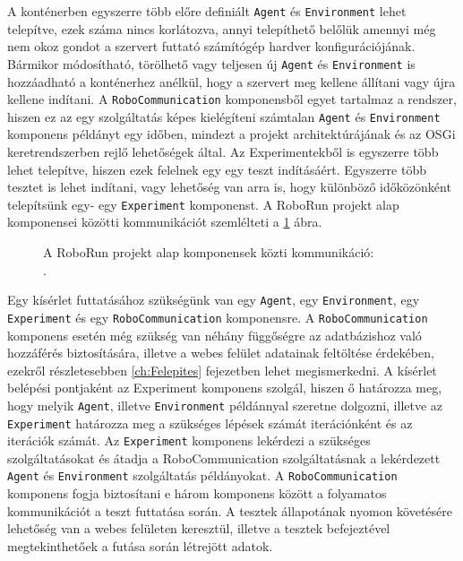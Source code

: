 	 A konténerben egyszerre több előre definiált \texttt{Agent} és \texttt{Environment} lehet telepítve, ezek száma nincs korlátozva, annyi telepíthető belőlük amennyi még nem okoz gondot a szervert futtató számítógép hardver konfigurációjának. Bármikor módosítható, törölhető vagy teljesen új \texttt{Agent} és \texttt{Environment} is hozzáadható a konténerhez anélkül, hogy a szervert meg kellene állítani vagy újra kellene indítani. A \texttt{RoboCommunication} komponensből egyet tartalmaz a rendszer, hiszen ez az egy szolgáltatás képes kielégíteni számtalan \texttt{Agent} és \texttt{Environment} komponens példányt egy időben, mindezt a projekt architektúrájának és az OSGi keretrendszerben rejlő lehetőségek által. Az Experimentekből is egyszerre több lehet telepítve, hiszen ezek felelnek egy egy teszt indításáért. Egyszerre több tesztet is lehet indítani, vagy lehetőség van arra is, hogy különböző időközönként telepítsünk egy- egy \texttt{Experiment} komponenst. A RoboRun projekt alap komponensei közötti kommunikációt szemlélteti a \ref{fig:OsgiAlap} ábra.

\begin{figure}[h!]
  \centering
  \caption[RoboRun alap komponensek]%
  {A RoboRun projekt alap komponensek közti kommunikáció:\\
  {\white .}\hfill\url{}}
  \label{fig:OsgiAlap}
\end{figure}


Egy kísérlet futtatásához szükségünk van egy \texttt{Agent}, egy \texttt{Environment}, egy \texttt{Experiment} és egy \texttt{RoboCommunication} komponensre. A \texttt{RoboCommunication} komponens esetén még szükség van néhány függőségre az adatbázishoz való hozzáférés biztosítására, illetve a webes felület adatainak feltöltése érdekében, ezekről részletesebben \ref{ch:Felepites} fejezetben lehet megismerkedni. A kísérlet belépési pontjaként az Experiment komponens szolgál, hiszen ő határozza meg, hogy melyik \texttt{Agent}, illetve \texttt{Environment} példánnyal szeretne dolgozni, illetve az \texttt{Experiment} határozza meg a szükséges lépések számát iterációnként és az iterációk számát. Az \texttt{Experiment} komponens lekérdezi a szükséges szolgáltatásokat és átadja a RoboCommunication szolgáltatásnak a lekérdezett \texttt{Agent} és \texttt{Environment} szolgáltatás példányokat. A \texttt{RoboCommunication} komponens fogja biztosítani e három komponens között a folyamatos kommunikációt a teszt futtatása során. A tesztek állapotának nyomon követésére lehetőség van a webes felületen keresztül, illetve a tesztek befejeztével megtekinthetőek a futása során létrejött adatok.

